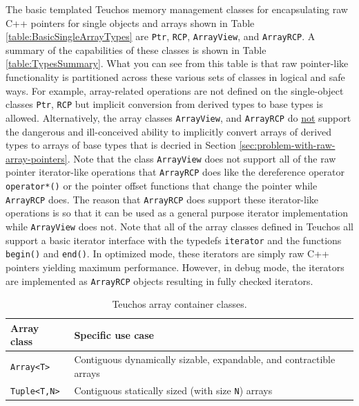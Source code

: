\documentclass[pdf,ps2pdf,11pt]{SANDreport}
\begin{document}
The basic templated Teuchos memory management classes for encapsulating
raw C++ pointers for single objects and arrays shown in Table
{}\ref{table:BasicSingleArrayTypes} are {}\texttt{Ptr},
{}\texttt{RCP}, {}\texttt{ArrayView}, and {}\texttt{ArrayRCP}.  A
summary of the capabilities of these classes is shown in Table
{}\ref{table:TypesSummary}.  What you can see from this table is that
raw pointer-like functionality is partitioned across these various
sets of classes in logical and safe ways.  For example, array-related
operations are not defined on the single-object classes
{}\texttt{Ptr}, {}\texttt{RCP} but implicit conversion from derived
types to base types is allowed.  Alternatively, the array classes
{}\texttt{ArrayView}, and {}\texttt{ArrayRCP} do {}\underline{not}
support the dangerous and ill-conceived ability to implicitly convert
arrays of derived types to arrays of base types that is decried in
Section {}\ref{sec:problem-with-raw-array-pointers}.  Note that the
class {}\texttt{ArrayView} does not support all of the raw pointer
iterator-like operations that {}\texttt{ArrayRCP} does like the
dereference operator {}\texttt{operator*()} or the pointer offset
functions that change the pointer while {}\texttt{ArrayRCP} does.  The
reason that {}\texttt{ArrayRCP} does support these iterator-like
operations is so that it can be used as a general purpose iterator
implementation while {}\texttt{ArrayView} does not.  Note that all of
the array classes defined in Teuchos all support a basic iterator
interface with the typedefs {}\texttt{iterator} and the functions
{}\texttt{begin()} and {}\texttt{end()}.  In optimized mode, these
iterators are simply raw C++ pointers yielding maximum performance.
However, in debug mode, the iterators are implemented as
{}\texttt{ArrayRCP} objects resulting in fully checked iterators.

\begin{table}
\begin{center}
\begin{tabular}{|l|l|}
\hline
Array class
& Specific use case \\
\hline
{}\texttt{Array<T>}
&  Contiguous dynamically sizable, expandable, and contractible arrays \\
{}\texttt{Tuple<T,N>}
&  Contiguous statically sized (with size {}\texttt{N}) arrays \\
\hline
\end{tabular}
\end{center}
\caption{\label{table:ExtendedArrayTypes}
Teuchos array container classes.}
\end{table}
\end{document}
